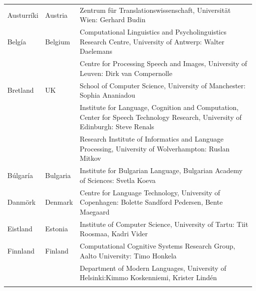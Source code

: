 \cleardoublepage

\appendix
{}



  
\cleardoublepage

\label{metanetmembers}

\small
\begin{longtable}{llp{105mm}}
 Austurríki & \textcolor{grey1}{Austria} & Zentrum für Translationswissenschaft, Universität Wien: Gerhard Budin\\ \addlinespace 
  Belgía & \textcolor{grey1}{Belgium} & Computational Linguistics and Psycholinguistics Research Centre, University of Antwerp: Walter Daelemans\\ \addlinespace
  & & Centre for Processing Speech and Images, University of Leuven: \newline Dirk van Compernolle \\ \addlinespace
  Bretland & \textcolor{grey1}{UK} & 
  School of Computer Science, University of Manchester: Sophia Ananiadou \\ \addlinespace 
  & & Institute for Language, Cognition and Computation, Center for Speech Technology Research, University of Edinburgh: Steve Renals \\ \addlinespace 
  & & Research Institute of Informatics and Language Processing, University of Wolverhampton: Ruslan Mitkov \\ \addlinespace 
  Búlgaría & \textcolor{grey1}{Bulgaria} & Institute for Bulgarian Language, Bulgarian Academy of Sciences: Svetla Koeva \\ \addlinespace
  Danmörk &  \textcolor{grey1}{Denmark} & Centre for Language Technology, University of Copenhagen: \newline Bolette Sandford Pedersen, Bente Maegaard\\ \addlinespace
  Eistland & \textcolor{grey1}{Estonia} & Institute of Computer Science, University of Tartu: Tiit Roosmaa, Kadri Vider\\ \addlinespace
  Finnland & \textcolor{grey1}{Finland} & Computational Cognitive Systems Research Group, Aalto University: \newline Timo Honkela\\ \addlinespace
  & & Department of Modern Languages, University of Helsinki:\newline Kimmo Koskenniemi, Krister Lindén \\ \addlinespace

\end{longtable}
